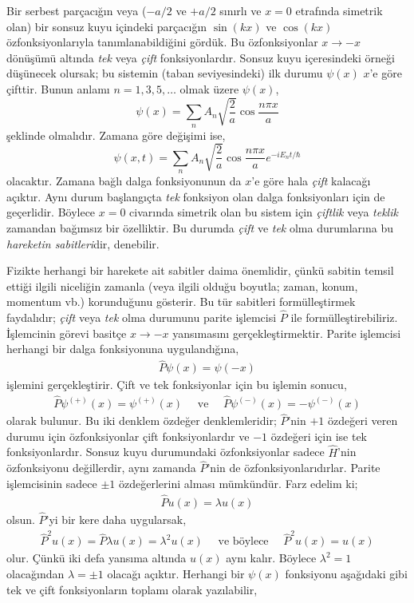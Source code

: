 \documentclass[00_kitap.tex]{subfiles}
\begin{document}
Bir serbest parçacığın veya ($-a/2$ ve $+a/2$ sınırlı ve  $x=0$ etrafında simetrik olan) bir sonsuz kuyu içindeki parçacığın $\sin(kx)$ ve $\cos(kx)$ özfonksiyonlarıyla tanımlanabildiğini gördük. Bu özfonksiyonlar $x \rightarrow -x$ dönüşümü altında \emph{tek} veya \emph{çift} fonksiyonlardır.
Sonsuz kuyu içeresindeki örneği düşünecek olursak; bu sistemin (taban seviyesindeki) ilk durumu $\psi(x)$ $x$'e göre çifttir. Bunun anlamı $n=1,3,5,\ldots$ olmak üzere $\psi(x)$,
\begin{equation}
\psi(x)=\sum_{n} A_{n} \sqrt{\frac{2}{a}} \cos \frac{n \pi x}{a}
\end{equation}
şeklinde olmalıdır. Zamana göre değişimi ise,
\begin{equation}
\psi(x, t)=\sum_{n} A_{n} \sqrt{\frac{2}{a}} \cos \frac{n \pi x}{a} e^{-i E_{n} t / \hbar}
\end{equation}
olacaktır. Zamana bağlı dalga fonksiyonunun da $x$'e göre hala \emph{çift} kalacağı açıktır. Aynı durum başlangıçta \emph{tek} fonksiyon olan dalga fonksiyonları için de geçerlidir. Böylece $x=0$ civarında simetrik olan bu sistem için \emph{çiftlik} veya \emph{teklik} zamandan bağımsız bir özelliktir. Bu durumda \emph{çift} ve \emph{tek} olma durumlarına bu \emph{hareketin sabitleri}dir, denebilir. 

Fizikte herhangi bir harekete ait sabitler daima önemlidir, çünkü sabitin temsil ettiği ilgili niceliğin zamanla (veya ilgili olduğu boyutla; zaman, konum, momentum vb.) korunduğunu gösterir. Bu tür sabitleri formülleştirmek faydalıdır; \emph{çift} veya \emph{tek} olma durumunu parite işlemcisi $\hat P$ ile formülleştirebiliriz. İşlemcinin görevi basitçe $x\rightarrow -x$ yansımasını gerçekleştirmektir. Parite işlemcisi herhangi bir dalga fonksiyonuna uygulandığına,
\begin{align}
\hat P \psi(x)=\psi(-x)
\end{align}
işlemini gerçekleştirir. Çift ve tek fonksiyonlar için bu işlemin sonucu,
\begin{align}
\hat P \psi^{(+)}(x)=\psi^{(+)}(x)
\quad \text{ ve } \quad \hat P \psi^{(-)}(x)=-\psi^{(-)}(x)
\end{align}
olarak bulunur. Bu iki denklem özdeğer denklemleridir; $\hat P$'nin $+1$ özdeğeri veren durumu için özfonksiyonlar çift fonksiyonlardır ve $-1$ özdeğeri için ise tek fonksiyonlardır. Sonsuz kuyu durumundaki özfonksiyonlar sadece $\hat H$'nin özfonksiyonu değillerdir, aynı zamanda $\hat P$'nin de özfonksiyonlarıdırlar. Parite işlemcisinin sadece $\pm 1$ özdeğerlerini alması mümkündür. Farz edelim ki;
\begin{align}
\hat P u(x)=\lambda u(x)
\end{align}
olsun. $\hat P$'yi bir kere daha uygularsak,
\begin{align}
\hat P^2 u(x)=\hat P \lambda u(x)
= \lambda^2 u(x) \quad \text{ ve böylece }  \quad  \hat P^2 u(x)= u(x) 
\end{align}
olur. Çünkü  iki defa yansıma altında $u(x)$ aynı kalır. Böylece $\lambda^2 = 1$ olacağından $\lambda = \pm 1$ olacağı açıktır. Herhangi bir $\psi(x)$ fonksiyonu aşağıdaki gibi tek ve çift fonksiyonların toplamı olarak yazılabilir,
\end{document}
